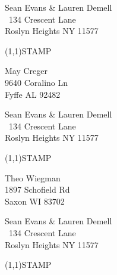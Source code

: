 \documentclass[12pt]{article}
\begin{document}
\begin{minipage}{.5\linewidth} \noindent
Sean Evans \& Lauren Demell\\\ 
134 Crescent Lane\\ 
Roslyn Heights NY 11577
\end{minipage}
\begin{minipage}{.5\linewidth \hspace{-.2in} \vspace{-.3in}}
\begin{flushright}
\framebox(1,1){STAMP}
\end{flushright}
\end{minipage}

\begin{center} \begin{Huge} \vspace*{\fill}
May Creger\\
9640 Coralino Ln\\
Fyffe AL 92482\\
\vspace{\fill} \end{Huge} \end{center}

\clearpage

\begin{minipage}{.5\linewidth} \noindent
Sean Evans \& Lauren Demell\\\ 
134 Crescent Lane\\ 
Roslyn Heights NY 11577
\end{minipage}
\begin{minipage}{.5\linewidth \hspace{-.2in} \vspace{-.3in}}
\begin{flushright}
\framebox(1,1){STAMP}
\end{flushright}
\end{minipage}

\begin{center} \begin{Huge} \vspace*{\fill}
Theo Wiegman\\
1897 Schofield Rd\\
Saxon WI 83702\\
\vspace{\fill} \end{Huge} \end{center}

\clearpage

\begin{minipage}{.5\linewidth} \noindent
Sean Evans \& Lauren Demell\\\ 
134 Crescent Lane\\ 
Roslyn Heights NY 11577
\end{minipage}
\begin{minipage}{.5\linewidth \hspace{-.2in} \vspace{-.3in}}
\begin{flushright}
\framebox(1,1){STAMP}
\end{flushright}
\end{minipage}
\end{document}
